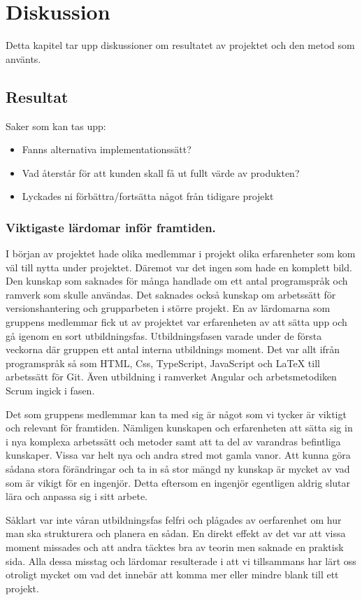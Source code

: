 \chapter{Diskussion}
Detta kapitel tar upp diskussioner om resultatet av projektet och den metod som använts.
\section{Resultat}
Saker som kan tas upp:
\begin{itemize}
\item Fanns alternativa implementationssätt?
\item Vad återstår för att kunden skall få ut fullt värde av produkten?
\item Lyckades ni förbättra/fortsätta något från tidigare projekt
\end{itemize}

\subsection{Viktigaste lärdomar inför framtiden.}
I början av projektet hade olika medlemmar i projekt olika erfarenheter som kom väl till nytta under projektet. Däremot var det ingen som hade en komplett bild. Den kunskap som saknades för många handlade om ett antal programspråk och ramverk som skulle användas. Det saknades också kunskap om arbetssätt för versionshantering och grupparbeten i större projekt. En av lärdomarna som gruppens medlemmar fick ut av projektet var erfarenheten av att sätta upp och gå igenom en sort utbildningsfas. Utbildningsfasen varade under de första veckorna där gruppen ett antal interna utbildnings moment. Det var allt ifrån programspråk så som HTML, Css, TypeScript, JavaScript och LaTeX till arbetssätt för Git. Även utbildning i ramverket Angular och arbetsmetodiken Scrum ingick i fasen.

Det som gruppens medlemmar kan ta med sig är något som vi tycker är viktigt och relevant för framtiden. Nämligen kunskapen och erfarenheten att sätta sig in i nya komplexa arbetssätt och metoder samt att ta del av varandras befintliga kunskaper. Vissa var helt nya och andra stred mot gamla vanor. Att kunna göra sådana stora förändringar och ta in så stor mängd ny kunskap är mycket av vad som är vikigt för en ingenjör. Detta eftersom en ingenjör egentligen aldrig slutar lära och anpassa sig i sitt arbete.

Såklart var inte våran utbildningsfas felfri och plågades av oerfarenhet om hur man ska strukturera och planera en sådan. En direkt effekt av det var att vissa moment missades och att andra täcktes bra av teorin men saknade en praktisk sida. Alla dessa misstag och lärdomar resulterade i att vi tillsammans har lärt oss otroligt mycket om vad det innebär att komma mer eller mindre blank till ett projekt.

